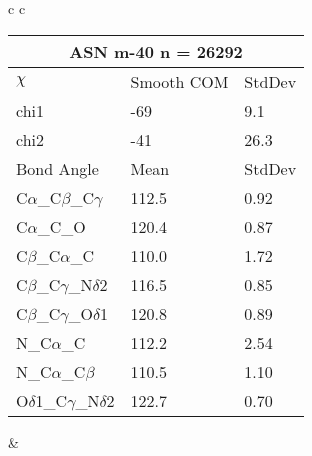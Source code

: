 \begin{longtable}{ c c }
\begin{tabular}{ l l l }
  \toprule
  \multicolumn{3}{c}{ASN \textbf{m-40} n = 26292} \\ \toprule
  $\chi$       & Smooth COM & StdDev \\ \midrule
  chi1 & -69 & 9.1 \\ 
  chi2 & -41 & 26.3 \\ \midrule
  Bond Angle   & Mean     & StdDev \\ \midrule
  C$\alpha$\_C$\beta$\_C$\gamma$ & 112.5 & 0.92\\
  C$\alpha$\_C\_O & 120.4 & 0.87\\
  C$\beta$\_C$\alpha$\_C & 110.0 & 1.72\\
  C$\beta$\_C$\gamma$\_N$\delta$2 & 116.5 & 0.85\\
  C$\beta$\_C$\gamma$\_O$\delta$1 & 120.8 & 0.89\\
  N\_C$\alpha$\_C & 112.2 & 2.54\\
  N\_C$\alpha$\_C$\beta$ & 110.5 & 1.10\\
  O$\delta$1\_C$\gamma$\_N$\delta$2 & 122.7 & 0.70\\
  \bottomrule
  \end{tabular}
  &
  \\
  
\end{longtable}

\newpage

